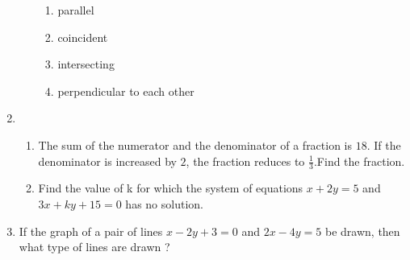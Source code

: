 \documentclass{article}
\begin{document}
\begin{enumerate}
\begin{enumerate}[label=(\roman*)]
\begin{enumerate}[label=(\Alph*)]
             \item parallel
             \item coincident
             \item intersecting
             \item perpendicular to each other
\end{enumerate}
\end{enumerate}
\item
\begin{enumerate}
\item The sum of the numerator and the denominator of a fraction is $18$. If the denominator is increased by $2$, the fraction reduces to $\frac{1}{3}$.Find the fraction.
\item Find the value of k for which the system of equations $x+2y=5$ and $3x+ky+15=0$ has no solution.
\end{enumerate}
\item If the graph of a pair of lines $x-2y+3=0$ and $2x-4y=5$ be drawn, then what type of lines are drawn ?
\end{enumerate}
\end{document}
